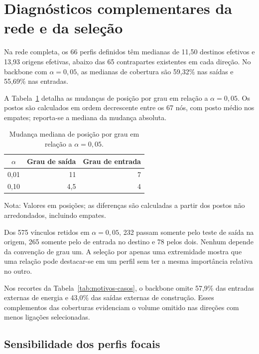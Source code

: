 \section{Diagnósticos complementares da rede e da seleção}
\label{anexo:diagnosticos}

Na rede completa, os 66 perfis definidos têm medianas de 11,50 destinos efetivos e 13,93 origens efetivas, abaixo das 65 contrapartes existentes em cada direção. No backbone com $\alpha=0{,}05$, as medianas de cobertura são 59,32\% nas saídas e 55,69\% nas entradas.

A Tabela~\ref{tab:postos-complementares} detalha as mudanças de posição por grau em relação a $\alpha=0{,}05$. Os postos são calculados em ordem decrescente entre os 67 nós, com posto médio nos empates; reporta-se a mediana da mudança absoluta.

\begin{table}[htbp]
\centering
\caption{Mudança mediana de posição por grau em relação a $\alpha=0{,}05$.}
\label{tab:postos-complementares}
\begin{tabular}{@{}crr@{}}
\toprule
$\alpha$ & Grau de saída & Grau de entrada \\
\midrule
0,01 & 11 & 7 \\
0,10 & 4,5 & 4 \\
\bottomrule
\end{tabular}
\begin{notas}
Nota: Valores em posições; as diferenças são calculadas a partir dos postos não arredondados, incluindo empates.
\end{notas}
\end{table}

Dos 575 vínculos retidos em $\alpha=0{,}05$, 232 passam somente pelo teste de saída na origem, 265 somente pelo de entrada no destino e 78 pelos dois. Nenhum depende da convenção de grau um. A seleção por apenas uma extremidade mostra que uma relação pode destacar-se em um perfil sem ter a mesma importância relativa no outro.

Nos recortes da Tabela~\ref{tab:motivos-casos}, o backbone omite 57,9\% das entradas externas de energia e 43,0\% das saídas externas de construção. Esses complementos das coberturas evidenciam o volume omitido nas direções com menos ligações selecionadas.


\subsection{Sensibilidade dos perfis focais}

